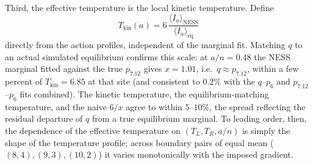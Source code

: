 \documentclass[11pt,a4paper]{article}
\theoremstyle{definition}
\numberwithin{equation}{section}   %
\begin{document}
Third, the effective temperature is the local kinetic temperature. Define
\[
  T_{\mathrm{kin}}(a)=
  6\,\frac{\langle I_a\rangle_{\mathrm{NESS}}}
          {\langle I_a\rangle_{\mathrm{eq}}}
\]
directly from the action profiles, independent of the marginal fit. Matching
$q$ to an actual simulated equilibrium confirms
this scale: at $a/n=0.48$ the NESS marginal fitted against the true $p_{7.12}$
gives $x=1.01$, i.e.\ $q\approx p_{7.12}$, within a few percent of
$T_{\mathrm{kin}}=6.85$ at that site (and consistent to $0.2\%$ with the
$q$--$p_6$ and $p_{7.12}$--$p_6$ fits combined). The kinetic temperature, the
equilibrium-matching temperature, and the naive $6/x$ agree to within
$5$--$10\%$, the spread reflecting the residual departure of $q$ from a true
equilibrium marginal. To leading order, then, the dependence of the effective
temperature on $(T_L,T_R,a/n)$ is simply the shape of the temperature profile;
across boundary pairs of equal mean ($(8,4),(9,3),(10,2)$) it varies
monotonically with the imposed gradient.
\end{document}
